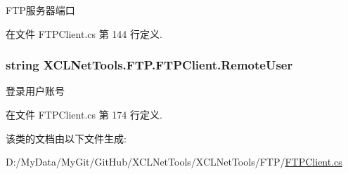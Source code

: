 F\-T\-P服务器端口 



在文件 F\-T\-P\-Client.\-cs 第 144 行定义.

\hypertarget{class_x_c_l_net_tools_1_1_f_t_p_1_1_f_t_p_client_ab97c698dca9a54f44b1e69cb15c1126d}{
\subsubsection[{Remote\-User}]{\setlength{\rightskip}{0pt plus 5cm}string X\-C\-L\-Net\-Tools.\-F\-T\-P.\-F\-T\-P\-Client.\-Remote\-User\hspace{0.3cm}{\ttfamily [set]}}}\label{class_x_c_l_net_tools_1_1_f_t_p_1_1_f_t_p_client_ab97c698dca9a54f44b1e69cb15c1126d}


登录用户账号 



在文件 F\-T\-P\-Client.\-cs 第 174 行定义.



该类的文档由以下文件生成\-:\begin{DoxyCompactItemize}
\item 
D\-:/\-My\-Data/\-My\-Git/\-Git\-Hub/\-X\-C\-L\-Net\-Tools/\-X\-C\-L\-Net\-Tools/\-F\-T\-P/\hyperlink{_f_t_p_client_8cs}{F\-T\-P\-Client.\-cs}\end{DoxyCompactItemize}
